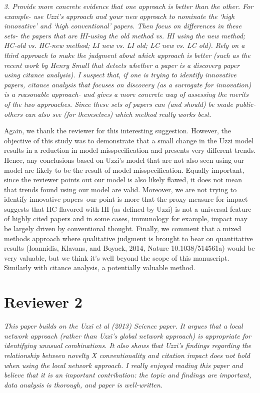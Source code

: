 \documentclass[11pt, oneside]{article}   	%
\begin{document}
 
\emph{3. Provide more concrete evidence that one approach is better than the other.  For example- use Uzzi's approach and your new approach to nominate the `high innovative' and `high conventional' papers.   Then focus on differences in these sets- the papers that are HI-using the old method vs. HI using the new method; HC-old vs. HC-new method; LI new vs. LI old; LC new vs. LC old).  Rely on a third approach to make the judgment about which approach is better (such as the recent work by Henry Small that detects whether a paper is a discovery paper using citance analysis). I suspect that, if one is trying to identify innovative papers, citance analysis that focuses on discovery (as a surrogate for innovation) is a reasonable approach- and gives a more concrete way of assessing the merits of the two approaches. Since these sets of papers can (and should) be made public- others can also see (for themselves) which method really works best.} 

Again, we thank the reviewer for this interesting suggestion. However, the objective of this study was to demonstrate that a small change in the  Uzzi model results in a reduction in model misspecification and presents very different trends. Hence, any conclusions based on Uzzi's model that are not also seen  using our model are likely to be the result of  model misspecification. Equally important, since the reviewer points out our model is also likely flawed, it does not mean that trends found using our model are valid. Moreover, we are not trying to identify innovative papers--our point is more that the proxy measure for impact suggests that HC flavored with HI (as defined by Uzzi) is not a universal feature of highly cited papers and in some cases, immunology for example, impact may be largely driven by conventional thought. Finally, we comment that a mixed methods approach where qualitative judgment is brought to bear on quantitative results (Ioannidis, Klavans, and Boyack, 2014, Nature 10.1038/514561a) would be very valuable, but we think it's well beyond the scope of this manuscript. Similarly with citance analysis, a potentially valuable method.

\section{Reviewer 2}

\emph{This paper builds on the Uzzi et al (2013) Science paper.  It argues that a local network approach (rather than Uzzi's global network approach) is appropriate for identifying unusual combinations.  It also shows that Uzzi's findings regarding the relationship between novelty X conventionality and citation impact does not hold when using the local network approach. I really enjoyed reading this paper and believe that it is an important contribution: the topic and findings are important, data analysis is thorough, and paper is well-written.}
\end{document}

